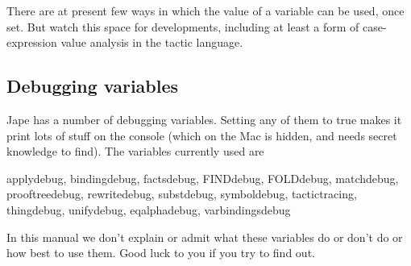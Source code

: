 There are at present few ways in which the value of a variable can be used, once set. But watch this space for developments, including at least a form of case-expression value analysis in the tactic language.


\subsection{Debugging variables}


Jape has a number of debugging variables. Setting any of them to true makes it print lots of stuff on the console (which on the Mac is hidden, and needs secret knowledge to find). The variables currently used are


applydebug, bindingdebug, factsdebug, FINDdebug, FOLDdebug, matchdebug, prooftreedebug, rewritedebug, substdebug, symboldebug, tactictracing, thingdebug, unifydebug, eqalphadebug, varbindingsdebug


In this manual we don't explain or admit what these variables do or don't do or how best to use them. Good luck to you if you try to find out.
 